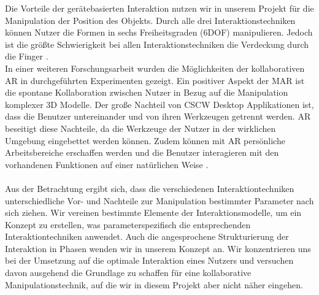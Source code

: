\documentclass[12pt,a4paper, oneside]{scrartcl}
\begin{document}
Die Vorteile der gerätebasierten Interaktion nutzen wir in unserem Projekt für die Manipulation der Position des Objekts. Durch alle drei Interaktionstechniken können Nutzer die Formen in sechs Freiheitsgraden (6DOF) manipulieren. Jedoch ist die größte Schwierigkeit bei allen Interaktionstechniken die Verdeckung durch die Finger \cite{goh_sunar_ismail_2019}. \\
In einer weiteren Forschungsarbeit wurden die Möglichkeiten der kollaborativen AR in durchgeführten Experimenten gezeigt. Ein positiver Aspekt der MAR ist die spontane Kollaboration zwischen Nutzer in Bezug auf die Manipulation komplexer 3D Modelle. Der große Nachteil von CSCW Desktop Applikationen ist, dass die Benutzer untereinander und von ihren Werkzeugen getrennt werden. AR beseitigt diese Nachteile, da die Werkzeuge der Nutzer in der wirklichen Umgebung eingebettet werden können. Zudem können mit AR persönliche Arbeitsbereiche erschaffen werden und die Benutzer interagieren mit den vorhandenen Funktionen auf einer natürlichen Weise \cite{reitmayr_schmalstieg}. \\
\\
Aus der Betrachtung ergibt sich, dass die verschiedenen Interaktiontechniken unterschiedliche Vor- und Nachteile zur Manipulation bestimmter Parameter nach sich ziehen. Wir vereinen bestimmte Elemente der Interaktionsmodelle, um ein Konzept zu erstellen, was parameterspezifisch die entsprechenden Interaktiontechniken anwendet. 
Auch die angesprochene Strukturierung der Interaktion in Phasen wenden wir in unserem Konzept an.
Wir konzentrieren uns bei der Umsetzung auf die optimale Interaktion eines Nutzers und versuchen davon ausgehend die Grundlage zu schaffen für eine kollaborative Manipulationstechnik, auf die wir in diesem Projekt aber nicht näher eingehen.
\end{document}
